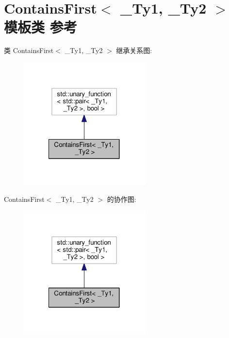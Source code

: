 \hypertarget{class_contains_first}{\section{Contains\+First$<$ \+\_\+\+Ty1, \+\_\+\+Ty2 $>$ 模板类 参考}
\label{class_contains_first}
}


类 Contains\+First$<$ \+\_\+\+Ty1, \+\_\+\+Ty2 $>$ 继承关系图\+:
\nopagebreak
\begin{figure}[H]
\begin{center}
\leavevmode
\includegraphics[width=188pt]{class_contains_first__inherit__graph}
\end{center}
\end{figure}


Contains\+First$<$ \+\_\+\+Ty1, \+\_\+\+Ty2 $>$ 的协作图\+:
\nopagebreak
\begin{figure}[H]
\begin{center}
\leavevmode
\includegraphics[width=188pt]{class_contains_first__coll__graph}
\end{center}
\end{figure}
